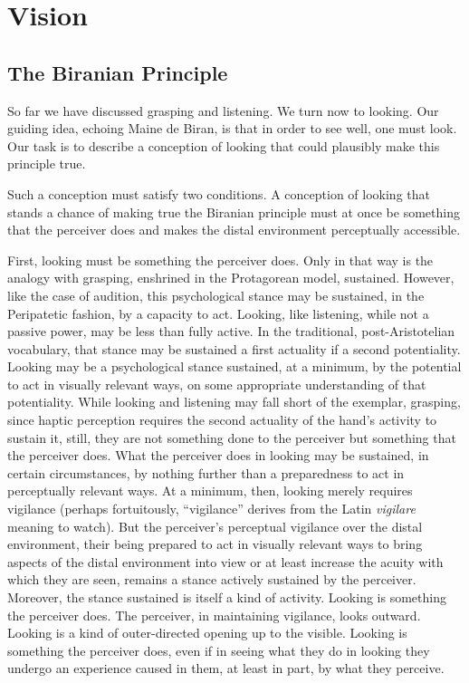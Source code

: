 \chapter{Vision} %
\label{cha:vision}

\section{The Biranian Principle} %
\label{sec:the_birnaian_principle}

So far we have discussed grasping and listening. We turn now to looking. Our guiding idea, echoing Maine de Biran, is that in order to see well, one must look. Our task is to describe a conception of looking that could plausibly make this principle true. 

Such a conception must satisfy two conditions. A conception of looking that stands a chance of making true the Biranian principle must at once be something that the perceiver does and makes the distal environment perceptually accessible.

First, looking must be something the perceiver does. Only in that way is the analogy with grasping, enshrined in the Protagorean model, sustained. However, like the case of audition, this psychological stance may be sustained, in the Peripatetic fashion, by a capacity to act. Looking, like listening, while not a passive power, may be less than fully active. In the traditional, post-Aristotelian vocabulary, that stance may be sustained a first actuality if a second potentiality. Looking may be a psychological stance sustained, at a minimum, by the potential to act in visually relevant ways, on some appropriate understanding of that potentiality. While looking and listening may fall short of the exemplar, grasping, since haptic perception requires the second actuality of the hand's activity to sustain it, still, they are not something done to the perceiver but something that the perceiver does. What the perceiver does in looking may be sustained, in certain circumstances, by nothing further than a preparedness to act in perceptually relevant ways. At a minimum, then, looking merely requires vigilance (perhaps fortuitously, ``vigilance'' derives from the Latin \emph{vigilare} meaning to watch). But the perceiver's perceptual vigilance over the distal environment, their being prepared to act in visually relevant ways to bring aspects of the distal environment into view or at least increase the acuity with which they are seen, remains a stance actively sustained by the perceiver. Moreover, the stance sustained is itself a kind of activity. Looking is something the perceiver does. The perceiver, in maintaining vigilance, looks outward. Looking is a kind of outer-directed opening up to the visible. Looking is something the perceiver does, even if in seeing what they do in looking they undergo an experience caused in them, at least in part, by what they perceive.

